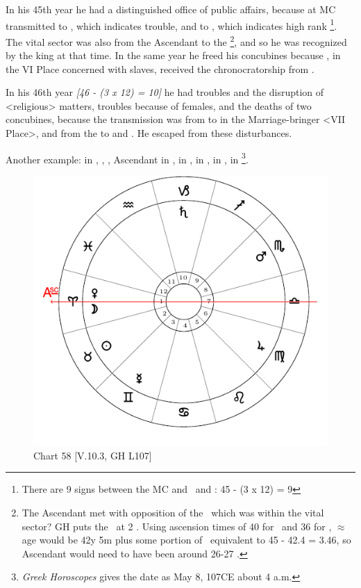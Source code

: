 In his 45th year he had a distinguished office of public affairs, because \Venus\xspace at MC transmitted to \Mars, which indicates trouble, and to \Jupiter, which indicates high rank \footnote{There are 9 signs between the MC and \Jupiter\, and \Mars: 45 - (3 x 12) = 9}. The vital sector was also from the Ascendant to the \Sun\footnote{The Ascendant met with opposition of the \Sun\, which was within the vital sector? GH puts the \Sun\, at 2 \Taurus. Using ascension times of 40 for \Libra\, and 36 for \Scorpio, $\approx$ age would be 42y 5m plus some portion of \Virgo\, equivalent to 45 - 42.4 = 3.46, so Ascendant would need to have been around 26-27 \Virgo.}, and so he was recognized by the king at that time. In the same year he freed his concubines because \Jupiter, in the VI Place concerned with slaves, received the chronocratorship from \Venus. 

In his 46th year \textsl{[46 - (3 x 12) = 10]} he had troubles and the disruption of <religious> matters, troubles because of females, and the deaths of two concubines, because the transmission was from \Venus\xspace to \Saturn\xspace in the Marriage-bringer <VII Place>, and from the \Sun\xspace to \Mars\xspace and \Jupiter. He escaped from these disturbances.

\newpage
Another example: \Sun\xspace in \Taurus, \Moon, \Venus, Ascendant in \Aries, \Saturn\xspace in \Capricorn, \Jupiter\xspace in \Virgo, \Mars\xspace in \Scorpio, \Mercury\xspace in \Gemini\footnote{\textit{Greek Horoscopes} gives the date as May 8, 107CE about 4 a.m.}. 

\begin{figure}
\centering
\vspace{-20pt}
\includegraphics[width=.68\textwidth]{charts/5_10_03}
\caption{Chart 58 [V.10.3, GH L107]}
\label{fig:chart58}
\end{figure}


